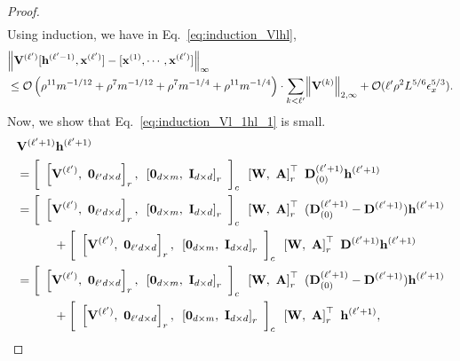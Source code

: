\begin{proof}
\begin{align}
	\end{align}
	\endgroup
	Using induction, we have in Eq.~\ref{eq:induction_Vlhl}, 
	\begin{align*}
		&\norm{ \mathbf{V}^{(\ell')} [\mathbf{h}^{(\ell'-1)}, \mathbf{x}^{(\ell')}] - [\mathbf{x}^{(1)}, \cdots, \mathbf{x}^{(\ell')}]}_\infty \\&\le \mathcal{O}\left(\rho^{11} m^{-1/12} + \rho^{7} m^{-1/12} + \rho^{7} m^{-1/4} + \rho^{11} m^{-1/4}  \right)  \cdot \sum_{k < \ell'} \norm{\mathbf{V}^{(k)}}_{2, \infty} + \mathcal{O}(\ell' \rho^2 L^{5/6} \epsilon_x^{5/3}).
	\end{align*} 
	Now, we show that Eq.~\ref{eq:induction_Vl_1hl_1} is small. 
	\begingroup\allowdisplaybreaks
	\begin{align}
		&\bV^{(\ell' + 1)}  \mathbf{h}^{(\ell' + 1)} \nonumber\\&
		= \left[\text{ }\left[\bV^{(\ell')}, \text{ } \mathbf{0}_{\ell'd \times d}\right]_r,\text{ } \left[\mathbf{0}_{d \times m},\text{ } \mathbf{I}_{d \times d}\right]_r\text{ }\right]_c  \text{ } \left[\mathbf{W}, \text{ } \mathbf{A}\right]_r^{\top} \text{ }  \mathbf{D}^{(\ell'+1)}_{(0)} \mathbf{h}^{(\ell' + 1)} \nonumber\\&
		= \left[\text{ }\left[\bV^{(\ell')}, \text{ } \mathbf{0}_{\ell'd \times d}\right]_r,\text{ } \left[\mathbf{0}_{d \times m},\text{ } \mathbf{I}_{d \times d}\right]_r\text{ }\right]_c  \text{ } \left[\mathbf{W}, \text{ } \mathbf{A}\right]_r^{\top} \text{ }  (\mathbf{D}^{(\ell'+1)}_{(0)} - \mathbf{D}^{(\ell'+1)}) \mathbf{h}^{(\ell' + 1)}\nonumber \\&
		\quad \quad \quad + \left[\text{ }\left[\bV^{(\ell')}, \text{ } \mathbf{0}_{\ell'd \times d}\right]_r,\text{ } \left[\mathbf{0}_{d \times m},\text{ } \mathbf{I}_{d \times d}\right]_r\text{ }\right]_c  \text{ } \left[\mathbf{W}, \text{ } \mathbf{A}\right]_r^{\top} \text{ }  \mathbf{D}^{(\ell'+1)} \mathbf{h}^{(\ell' + 1)} \nonumber\\&
		= \left[\text{ }\left[\bV^{(\ell')}, \text{ } \mathbf{0}_{\ell'd \times d}\right]_r,\text{ } \left[\mathbf{0}_{d \times m},\text{ } \mathbf{I}_{d \times d}\right]_r\text{ }\right]_c  \text{ } \left[\mathbf{W}, \text{ } \mathbf{A}\right]_r^{\top} \text{ }  (\mathbf{D}^{(\ell'+1)}_{(0)} - \mathbf{D}^{(\ell'+1)}) \mathbf{h}^{(\ell' + 1)} \label{eq:induction_Vl1h1_eq1}\\&
		\quad \quad \quad + \left[\text{ }\left[\bV^{(\ell')}, \text{ } \mathbf{0}_{\ell'd \times d}\right]_r,\text{ } \left[\mathbf{0}_{d \times m},\text{ } \mathbf{I}_{d \times d}\right]_r\text{ }\right]_c  \text{ } \left[\mathbf{W}, \text{ } \mathbf{A}\right]_r^{\top} \text{ }  \mathbf{h}^{(\ell' + 1)}, \label{eq:induction_Vl1h1_eq2}

\end{align}
\end{proof}
